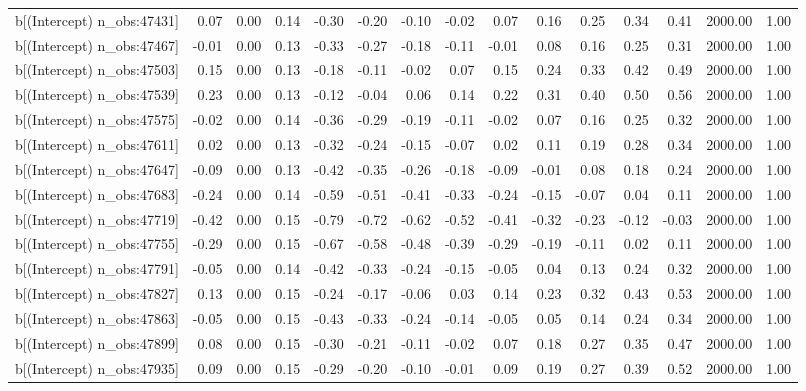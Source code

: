 \begin{table}[ht]
\begin{tabular}{rrrrrrrrrrrrrrr}
  b[(Intercept) n\_obs:47431] & 0.07 & 0.00 & 0.14 & -0.30 & -0.20 & -0.10 & -0.02 & 0.07 & 0.16 & 0.25 & 0.34 & 0.41 & 2000.00 & 1.00 \\ 
  b[(Intercept) n\_obs:47467] & -0.01 & 0.00 & 0.13 & -0.33 & -0.27 & -0.18 & -0.11 & -0.01 & 0.08 & 0.16 & 0.25 & 0.31 & 2000.00 & 1.00 \\ 
  b[(Intercept) n\_obs:47503] & 0.15 & 0.00 & 0.13 & -0.18 & -0.11 & -0.02 & 0.07 & 0.15 & 0.24 & 0.33 & 0.42 & 0.49 & 2000.00 & 1.00 \\ 
  b[(Intercept) n\_obs:47539] & 0.23 & 0.00 & 0.13 & -0.12 & -0.04 & 0.06 & 0.14 & 0.22 & 0.31 & 0.40 & 0.50 & 0.56 & 2000.00 & 1.00 \\ 
  b[(Intercept) n\_obs:47575] & -0.02 & 0.00 & 0.14 & -0.36 & -0.29 & -0.19 & -0.11 & -0.02 & 0.07 & 0.16 & 0.25 & 0.32 & 2000.00 & 1.00 \\ 
  b[(Intercept) n\_obs:47611] & 0.02 & 0.00 & 0.13 & -0.32 & -0.24 & -0.15 & -0.07 & 0.02 & 0.11 & 0.19 & 0.28 & 0.34 & 2000.00 & 1.00 \\ 
  b[(Intercept) n\_obs:47647] & -0.09 & 0.00 & 0.13 & -0.42 & -0.35 & -0.26 & -0.18 & -0.09 & -0.01 & 0.08 & 0.18 & 0.24 & 2000.00 & 1.00 \\ 
  b[(Intercept) n\_obs:47683] & -0.24 & 0.00 & 0.14 & -0.59 & -0.51 & -0.41 & -0.33 & -0.24 & -0.15 & -0.07 & 0.04 & 0.11 & 2000.00 & 1.00 \\ 
  b[(Intercept) n\_obs:47719] & -0.42 & 0.00 & 0.15 & -0.79 & -0.72 & -0.62 & -0.52 & -0.41 & -0.32 & -0.23 & -0.12 & -0.03 & 2000.00 & 1.00 \\ 
  b[(Intercept) n\_obs:47755] & -0.29 & 0.00 & 0.15 & -0.67 & -0.58 & -0.48 & -0.39 & -0.29 & -0.19 & -0.11 & 0.02 & 0.11 & 2000.00 & 1.00 \\ 
  b[(Intercept) n\_obs:47791] & -0.05 & 0.00 & 0.14 & -0.42 & -0.33 & -0.24 & -0.15 & -0.05 & 0.04 & 0.13 & 0.24 & 0.32 & 2000.00 & 1.00 \\ 
  b[(Intercept) n\_obs:47827] & 0.13 & 0.00 & 0.15 & -0.24 & -0.17 & -0.06 & 0.03 & 0.14 & 0.23 & 0.32 & 0.43 & 0.53 & 2000.00 & 1.00 \\ 
  b[(Intercept) n\_obs:47863] & -0.05 & 0.00 & 0.15 & -0.43 & -0.33 & -0.24 & -0.14 & -0.05 & 0.05 & 0.14 & 0.24 & 0.34 & 2000.00 & 1.00 \\ 
  b[(Intercept) n\_obs:47899] & 0.08 & 0.00 & 0.15 & -0.30 & -0.21 & -0.11 & -0.02 & 0.07 & 0.18 & 0.27 & 0.35 & 0.47 & 2000.00 & 1.00 \\ 
  b[(Intercept) n\_obs:47935] & 0.09 & 0.00 & 0.15 & -0.29 & -0.20 & -0.10 & -0.01 & 0.09 & 0.19 & 0.27 & 0.39 & 0.52 & 2000.00 & 1.00 \\ 

\end{tabular}
\end{table}
